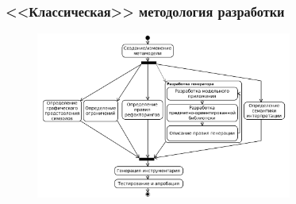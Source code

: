 \documentclass[14pt]{beamer}
\begin{document}
\begin{frame}
    \frametitle{<<Классическая>> методология разработки}
    \vspace*{-0.35cm}
    \begin{figure}
    	\begin{center}
    		\hspace{0.1cm}
    		\includegraphics[width=0.75\textwidth]{images/presentation/classicalModelIteration.png}
    	\end{center}
    \end{figure}
\end{frame}
\end{document}
